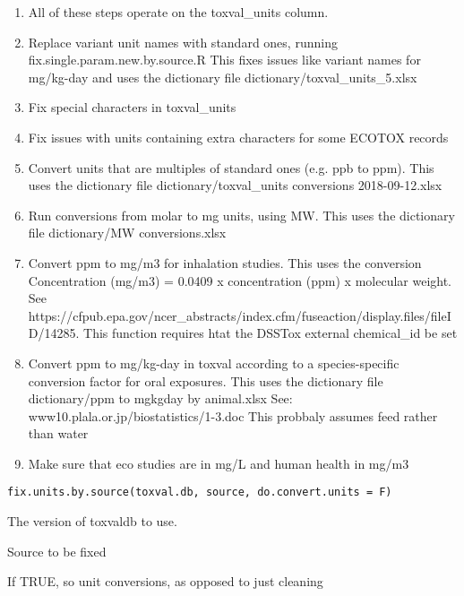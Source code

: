 \documentclass[letterpaper]{book}
\begin{document}
\begin{Description}\relax
\begin{enumerate}

\item{} All of these steps operate on the toxval\_units column.
\item{} Replace variant unit names with standard ones, running fix.single.param.new.by.source.R
This fixes issues like variant names for mg/kg-day and uses the dictionary
file dictionary/toxval\_units\_5.xlsx
\item{} Fix special characters in toxval\_units
\item{} Fix issues with units containing extra characters for some ECOTOX records
\item{} Convert units that are multiples of standard ones (e.g. ppb to ppm). This
uses the dictionary file dictionary/toxval\_units conversions 2018-09-12.xlsx
\item{} Run conversions from molar to mg units, using MW. This uses the dictionary file
dictionary/MW conversions.xlsx
\item{} Convert ppm to mg/m3 for inhalation studies. This uses the conversion Concentration
(mg/m3) = 0.0409 x concentration (ppm) x molecular weight. See
https://cfpub.epa.gov/ncer\_abstracts/index.cfm/fuseaction/display.files/fileID/14285.
This function requires htat the DSSTox external chemical\_id be set
\item{} Convert ppm to mg/kg-day in toxval according to a species-specific
conversion factor for oral exposures. This uses the dictionary file
dictionary/ppm to mgkgday by animal.xlsx
See: www10.plala.or.jp/biostatistics/1-3.doc
This probbaly assumes feed rather than water
\item{} Make sure that eco studies are in mg/L and human health in mg/m3

\end{enumerate}

\end{Description}
%
\begin{Usage}
\begin{verbatim}
fix.units.by.source(toxval.db, source, do.convert.units = F)
\end{verbatim}
\end{Usage}
%
\begin{Arguments}
\begin{ldescription}
\item[\code{toxval.db}] The version of toxvaldb to use.

\item[\code{source}] Source to be fixed

\item[\code{do.convert.units}] If TRUE, so unit conversions, as opposed to just cleaning
\end{ldescription}
\end{Arguments}
\end{document}
